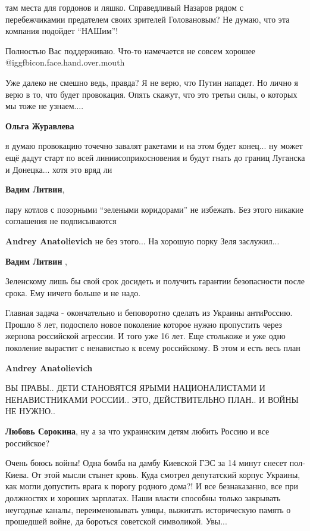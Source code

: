 \begin{itemize}
\begin{itemize}
там места для гордонов и ляшко. Справедливый Назаров рядом с перебежчикамии
предателем своих зрителей Головановым? Не думаю, что эта компания подойдет
\enquote{НАШим}!

\end{itemize} %

Полностью Вас поддерживаю. Что-то намечается не совсем хорошее  @igg{fbicon.face.hand.over.mouth} 


Уже далеко не смешно ведь, правда? Я не верю, что Путин нападет. Но лично я верю
в то, что будет провокация. Опять скажут, что это третьи силы, о которых мы
тоже не узнаем....

\begin{itemize} %
\textbf{Ольга Журавлева} 

я думаю провокацию точечно завалят ракетами и на этом будет конец... ну может ещё
дадут старт по всей линиисоприкосновения и будут гнать до границ Луганска и
Донецка... хотя это вряд ли

\textbf{Вадим Литвин}, 

пару котлов с позорными \enquote{зелеными коридорами} не избежать. Без этого
никакие соглашения не подписываются


\textbf{Andrey Anatolievich} не без этого... На хорошую порку Зеля заслужил...

\textbf{Вадим Литвин} , 

Зеленскому лишь бы свой срок досидеть и получить гарантии безопасности после
срока. Ему ничего больше и не надо.

Главная задача - окончательно и беповоротно сделать из Украины антиРоссию.
Прошло 8 лет, подоспело новое поколение которое нужно пропустить через жернова
российской агрессии. И того уже 16 лет. Еще столькоже и уже одно поколение
вырастит с ненавистью к всему российскому. В этом и есть весь план

\textbf{Andrey Anatolievich} 

ВЫ ПРАВЫ.. ДЕТИ СТАНОВЯТСЯ ЯРЫМИ НАЦИОНАЛИСТАМИ И НЕНАВИСТНИКАМИ РОССИИ.. ЭТО,
ДЕЙСТВИТЕЛЬНО ПЛАН.. И ВОЙНЫ НЕ НУЖНО..

\textbf{Любовь Сорокина}, ну а за что украинским детям любить Россию и все российское?


Очень боюсь войны! Одна бомба на дамбу Киевской ГЭС за 14 минут снесет
пол-Киева. От этой мысли стынет кровь. Куда смотрел депутатский корпус
Украины, как могли допустить врага к порогу родного дома?! И все
безнаказанно, все при должностях и хороших зарплатах. Наши власти способны только
закрывать неугодные каналы, переименовывать улицы, выжигать историческую память о
прошедшей войне, да бороться советской символикой. Увы...


\end{itemize}
\end{itemize}
